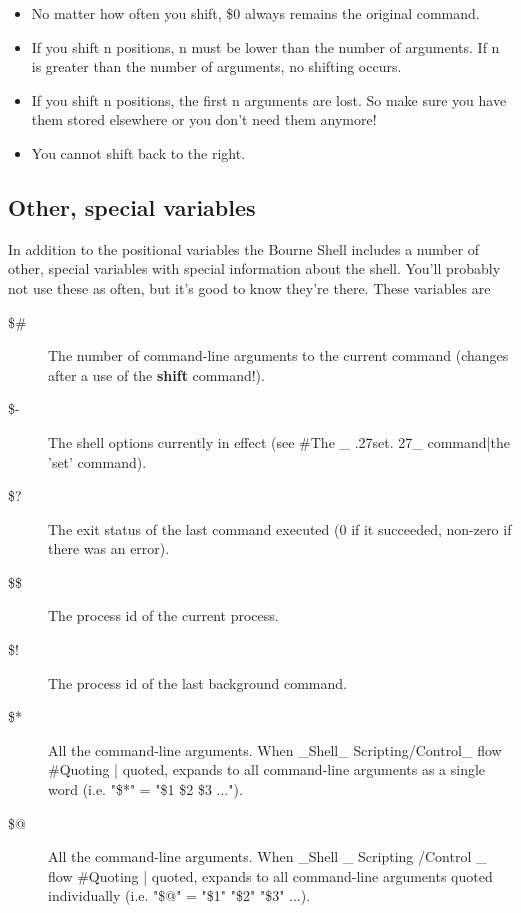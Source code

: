 \begin{itemize}
\item No matter how often you shift, \$0 always remains the original command.
\item If you shift n positions, n must be lower than the number of arguments.
If n is greater than the number of arguments, no shifting occurs.
\item If you shift n positions, the first n arguments are lost. So make sure
you have them stored elsewhere or you don't need them anymore!
\item You cannot shift back to the right.
\end{itemize}

\subsection{Other, special variables}
In addition to the positional variables the Bourne Shell includes a number of
other, special variables with special information about the shell. You'll
probably not use these as often, but it's good to know they're there. These
variables are
\begin{description}
	\item[\$\#]The number of command-line arguments to the current command (changes after a use of the \textbf{shift} command!).
	\item[\$-]The shell options currently in effect (see \#The \_ .27set. 27\_ command|the 'set' command).
	\item[\$?]The exit status of the last command executed (0 if it succeeded, non-zero if there was an error).
	\item[\$\$]The process id of the current process.
	\item[\$!]The process id of the last background command.
	\item[\$*]All the command-line arguments. When \_Shell\_ Scripting/Control\_ flow \#Quoting | quoted, expands to all command-line arguments as a single word (i.e. "\$*" = "\$1 \$2 \$3 ...").
	\item[\$@]All the command-line arguments. When \_Shell \_ Scripting /Control \_ flow \#Quoting | quoted, expands to all command-line arguments quoted individually (i.e. "\$@" = "\$1" "\$2" "\$3" ...).
\end{description}

